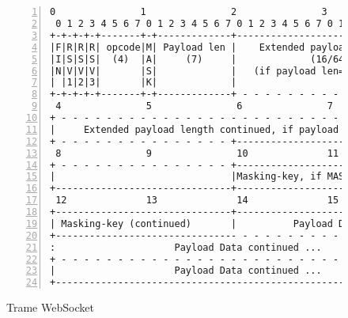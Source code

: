 \section{}
\begin{figure}[htp]
\centering
\begin{lstlisting}[gobble=0, numbers=left, frame=l,
  basewidth={0.55em, 0.4em}]
 0               1               2               3              
 0 1 2 3 4 5 6 7 0 1 2 3 4 5 6 7 0 1 2 3 4 5 6 7 0 1 2 3 4 5 6 7
+-+-+-+-+-------+-+-------------+-------------------------------+
|F|R|R|R| opcode|M| Payload len |    Extended payload length    |
|I|S|S|S|  (4)  |A|     (7)     |             (16/64)           |
|N|V|V|V|       |S|             |   (if payload len==126/127)   |
| |1|2|3|       |K|             |                               |
+-+-+-+-+-------+-+-------------+ - - - - - - - - - - - - - - - +
 4               5               6               7              
+ - - - - - - - - - - - - - - - - - - - - - - - - - - - - - - - +
|     Extended payload length continued, if payload len == 127  |
+ - - - - - - - - - - - - - - - +-------------------------------+
 8               9               10              11             
+ - - - - - - - - - - - - - - - +-------------------------------+
|                               |Masking-key, if MASK set to 1  |
+-------------------------------+-------------------------------+
 12              13              14              15
+-------------------------------+-------------------------------+
| Masking-key (continued)       |          Payload Data         |
+-------------------------------- - - - - - - - - - - - - - - - +
:                     Payload Data continued ...                :
+ - - - - - - - - - - - - - - - - - - - - - - - - - - - - - - - +
|                     Payload Data continued ...                |
+---------------------------------------------------------------+
\end{lstlisting}
\caption{Trame WebSocket}
\end{figure}
